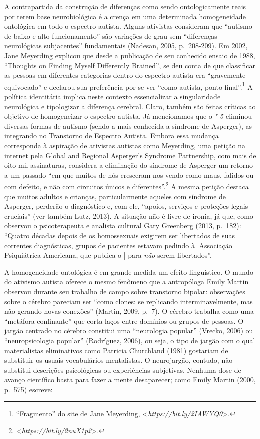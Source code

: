 A contrapartida da construção de diferenças como sendo ontologicamente
reais por terem base neurobiológica é a crença em uma determinada
homogeneidade ontológica em todo o espectro autista. Alguns ativistas
consideram que ``autismo de baixo e alto funcionamento'' são variações
de grau sem ``diferenças neurológicas subjacentes'' fundamentais
(Nadesan, 2005, p.~208-209). Em 2002, Jane Meyerding explicou que desde a
publicação de seu conhecido ensaio de 1988, ``Thoughts on Finding Myself
Differently Brained'', se deu conta de que classificar as pessoas em
diferentes categorias dentro do espectro autista era ``gravemente
equivocado'' e declarou sua preferência por se ver ``como autista, ponto
final''.\footnote[29]{``Fragmento'' do site de Jane Meyerding,
\textless{}\emph{https://bit.ly/2IAWYQ0}\textgreater{}.} A política identitária implica neste
contexto essencializar a singularidade neurológica e
tipologizar a diferença cerebral. Claro, também são feitas críticas ao
objetivo de homogeneizar o espectro autista. Já mencionamos que o
\emph{"-5} eliminou diversas formas de autismo (sendo a mais conhecida
a síndrome de Asperger), as integrando no Transtorno de Espectro
Autista. Embora essa mudança corresponda à aspiração de ativistas
autistas como Meyerding, uma petição na internet pela Global and
Regional Asperger's Syndrome Partnership, com mais de oito mil
assinaturas, considera a eliminação do síndrome de Asperger um retorno a
um passado ``em que muitos de nós cresceram nos vendo como maus, falidos
ou com defeito, e não com circuitos únicos e
diferentes''.\footnote[30]{\textless{}\emph{https://bit.ly/2nuX1p2}\textgreater{}.} A mesma petição destaca que muitos
adultos e crianças, particularmente aqueles com síndrome de Asperger,
perderão o diagnóstico e, com ele, ``apoios, serviços e proteções legais
cruciais'' (ver também Lutz, 2013). A situação não é livre de ironia, já
que, como observou o psicoterapeuta e analista cultural Gary Greenberg
(2013, p.~182): ``Quatro décadas depois de os homossexuais exigirem ser
libertados de suas correntes diagnósticas, grupos de pacientes estavam
pedindo à  {[}Associação Psiquiátrica Americana, que publica o
\emph{}{]} para \emph{não} serem libertados''.

A homogeneidade ontológica é em grande medida um efeito linguístico. O
mundo do ativismo autista oferece o mesmo fenômeno que a antropóloga
Emily Martin observou durante seu trabalho de campo sobre transtorno
bipolar: observações sobre o cérebro pareciam ser ``como clones: se
replicando interminavelmente, mas não gerando novas conexões'' (Martin,
2009, p.~7). O cérebro trabalha como uma ``metáfora confinante'' que
corta laços entre domínios ou grupos de pessoas. O jargão centrado no
cérebro constitui uma ``neurologia popular'' (Vrecko, 2006) ou
``neuropsicologia popular'' (Rodríguez, 2006), ou seja, o tipo de jargão
com o qual materialistas eliminativos como Patricia Churchland (1981)
gostariam de substituir os usuais vocabulários mentalistas. O
neurojargão, contudo, não substitui descrições psicológicas ou
experiências subjetivas. Nenhuma dose de avanço científico basta para
fazer a mente desaparecer; como Emily Martin (2000, p.~575) escreve:

